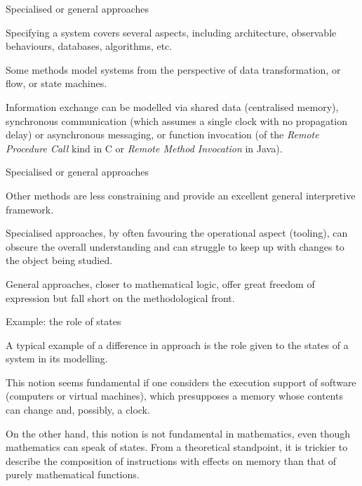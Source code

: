 \documentclass[compress,dvipdfmx]{beamer}
\begin{document}
%
\begin{frame}{Specialised or general approaches}

  Specifying a system covers several aspects, including architecture,
  observable behaviours, databases, algorithms, etc.

  \bigskip

  Some methods model systems from the perspective of data
  transformation, or flow, or state machines.

  \bigskip

  Information exchange can be modelled via shared data (centralised
  memory), synchronous communication (which assumes a single clock
  with no propagation delay) or asynchronous messaging, or function
  invocation (of the \emph{Remote Procedure Call} kind in \textsf{C}
  or \emph{Remote Method Invocation} in \textsf{Java}).

\end{frame}

%
\begin{frame}{Specialised or general approaches}

  Other methods are less constraining and provide an excellent general
  interpretive framework.

  \bigskip

  Specialised approaches, by often favouring the operational aspect
  (tooling), can obscure the overall understanding and can struggle to
  keep up with changes to the object being studied.

  \bigskip

  General approaches, closer to mathematical logic, offer great
  freedom of expression but fall short on the methodological front.

\end{frame}

%
\begin{frame}{Example: the role of states}

  A typical example of a difference in approach is the role given to
  the states of a system in its modelling.

  \bigskip

  This notion seems fundamental if one considers the execution support
  of software (computers or virtual machines), which presupposes a
  memory whose contents can change and, possibly, a clock.

  \bigskip

  On the other hand, this notion is not fundamental in mathematics,
  even though mathematics can speak of states. From a theoretical
  standpoint, it is trickier to describe the composition of
  instructions with effects on memory than that of purely mathematical
  functions.

\end{frame}
\end{document}
